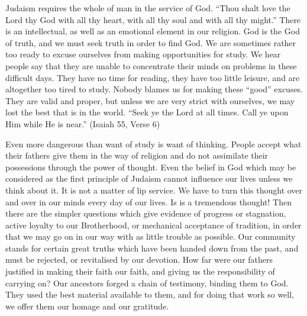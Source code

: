 Judaism requires the whole of man in the service of
God. ``Thou shalt love the Lord thy God with all thy heart,
with all thy soul and with all thy might.'' There is an
intellectual, as well as an emotional element in our religion.
God is the God of truth, and we must seek truth in
order to find God. We are sometimes rather too ready to
excuse ourselves from making opportunities for study. We
hear people say that they are unable to concentrate their
minds on problems in these difficult days. They have no
time for reading, they have too little leisure, and are
altogether too tired to study. Nobody blames us for making
these ``good'' excuses. They are valid and proper, but
unless we are very strict with ourselves, we may lost the
best that is in the world. ``Seek ye the Lord at all times.
Call ye upon Him while He is near.'' (Isaiah 55, Verse 6)

Even more dangerous than want of study is want of
thinking. People accept what their fathers give them in
the way of religion and do not assimilate their possessions
through the power of thought. Even the belief in God which
may be considered as the first principle of Judaism cannot
influence our lives unless we think about it. It is not a
matter of lip service. We have to turn this thought over
and over in our minds every day of our lives. Is is a
tremendous thought! Then there are the simpler questions
which give evidence of progress or stagnation, active
loyalty to our Brotherhood, or mechanical acceptance of
tradition, in order that we may go on in our way with as
little trouble as possible. Our community stands for
certain great truths which have been handed down from the
past, and must be rejected, or revitalised by our devotion.
How far were our fathers justified in making their faith
our faith, and giving us the responsibility of carrying on?
Our ancestors forged a chain of testimony, binding them to
God. They used the best material available to them, and
for doing that work so well, we offer them our homage and
our gratitude.

